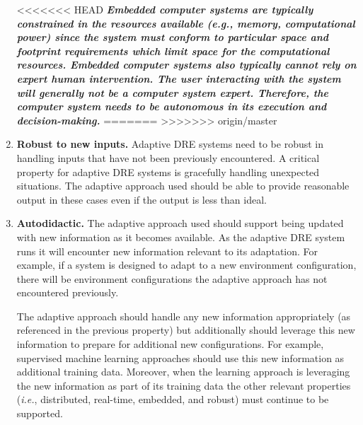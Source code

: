 \documentclass[conference]{IEEEtran}
\begin{document}
\begin{enumerate}
<<<<<<< HEAD
\textbf{\emph{Embedded computer systems are typically constrained in the resources available (\emph{e.g.}, memory, computational power) since the system must conform to particular space and footprint requirements which limit space for the computational resources. Embedded computer systems also typically cannot rely on expert human intervention. The user interacting with the system will generally not be a computer system expert. Therefore, the computer system needs to be autonomous in its execution and decision-making.}}
=======
>>>>>>> origin/master

\item \textbf{Robust to new inputs.} Adaptive DRE systems need to be robust in handling inputs that have not been previously encountered. A critical property for adaptive DRE systems is gracefully handling unexpected situations. The adaptive approach used should be able to provide reasonable output in these cases even if the output is less than ideal.

\item \textbf{Autodidactic.} %
The adaptive approach used should support being updated with new information as it becomes available. As the adaptive DRE system runs
it will encounter new information relevant to its adaptation. For example, if a system
is designed to adapt to a new environment configuration, there will be environment
configurations the adaptive approach has not encountered previously.

The adaptive approach should handle any new information appropriately (as referenced in the previous property) but additionally should
leverage this new information to prepare for additional new configurations. For example, supervised
machine learning approaches should use this new information as additional training data.
Moreover, when the learning approach is leveraging the new information as part of its training data the other relevant properties (\emph{i.e.}, distributed, real-time, embedded, and robust) must continue to be supported.

\end{enumerate}
\end{document}
